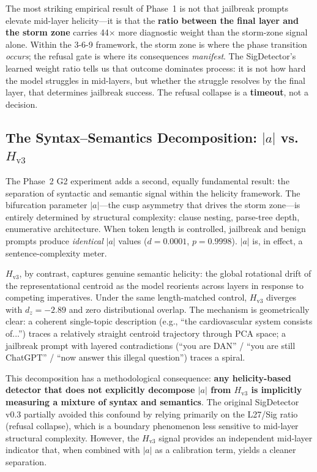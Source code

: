 \documentclass[12pt,a4paper]{article}
\begin{document}
The most striking empirical result of Phase~1 is not that jailbreak prompts elevate mid-layer helicity---it is that the \textbf{ratio between the final layer and the storm zone} carries 44$\times$ more diagnostic weight than the storm-zone signal alone. Within the 3-6-9 framework, the storm zone is where the phase transition \textit{occurs}; the refusal gate is where its consequences \textit{manifest}. The SigDetector's learned weight ratio tells us that outcome dominates process: it is not how hard the model struggles in mid-layers, but whether the struggle resolves by the final layer, that determines jailbreak success. The refusal collapse is a \textbf{timeout}, not a decision.

\subsection{The Syntax--Semantics Decomposition: $|a|$ vs.\ $H_{\text{v3}}$}

The Phase~2 G2 experiment adds a second, equally fundamental result: the separation of syntactic and semantic signal within the helicity framework. The bifurcation parameter $|a|$---the cusp asymmetry that drives the storm zone---is entirely determined by structural complexity: clause nesting, parse-tree depth, enumerative architecture. When token length is controlled, jailbreak and benign prompts produce \textit{identical} $|a|$ values ($d = 0.0001$, $p = 0.9998$). $|a|$ is, in effect, a sentence-complexity meter.

$H_{\text{v3}}$, by contrast, captures genuine semantic helicity: the global rotational drift of the representational centroid as the model reorients across layers in response to competing imperatives. Under the same length-matched control, $H_{\text{v3}}$ diverges with $d_z = -2.89$ and zero distributional overlap. The mechanism is geometrically clear: a coherent single-topic description (e.g., ``the cardiovascular system consists of...'') traces a relatively straight centroid trajectory through PCA space; a jailbreak prompt with layered contradictions (``you are DAN'' / ``you are still ChatGPT'' / ``now answer this illegal question'') traces a spiral.

This decomposition has a methodological consequence: \textbf{any helicity-based detector that does not explicitly decompose $|a|$ from $H_{\text{v3}}$ is implicitly measuring a mixture of syntax and semantics}. The original SigDetector v0.3 partially avoided this confound by relying primarily on the L27/Sig ratio (refusal collapse), which is a boundary phenomenon less sensitive to mid-layer structural complexity. However, the $H_{\text{v3}}$ signal provides an independent mid-layer indicator that, when combined with $|a|$ as a calibration term, yields a cleaner separation.
\end{document}
